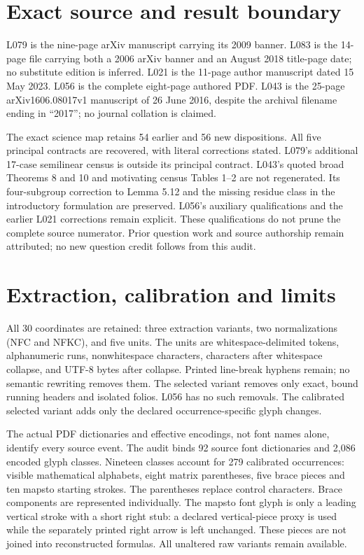 \documentclass[11pt,a4paper]{article}
\begin{document}
\section*{Exact source and result boundary}
L079 is the nine-page arXiv manuscript carrying its 2009 banner. L083 is the 14-page file carrying both a 2006 arXiv banner and an August 2018 title-page date; no substitute edition is inferred. L021 is the 11-page author manuscript dated 15 May 2023. L056 is the complete eight-page authored PDF. L043 is the 25-page arXiv1606.08017v1 manuscript of 26 June 2016, despite the archival filename ending in ``2017''; no journal collation is claimed.

The exact science map retains 54 earlier and 56 new dispositions. All five principal contracts are recovered, with literal corrections stated. L079's additional 17-case semilinear census is outside its principal contract. L043's quoted broad Theorems 8 and 10 and motivating census Tables 1--2 are not regenerated. Its four-subgroup correction to Lemma 5.12 and the missing residue class in the introductory formulation are preserved. L056's auxiliary qualifications and the earlier L021 corrections remain explicit. These qualifications do not prune the complete source numerator. Prior question work and source authorship remain attributed; no new question credit follows from this audit.
\newpage
\section*{Extraction, calibration and limits}
All 30 coordinates are retained: three extraction variants, two normalizations (NFC and NFKC), and five units. The units are whitespace-delimited tokens, alphanumeric runs, nonwhitespace characters, characters after whitespace collapse, and UTF-8 bytes after collapse. Printed line-break hyphens remain; no semantic rewriting removes them. The selected variant removes only exact, bound running headers and isolated folios. L056 has no such removals. The calibrated selected variant adds only the declared occurrence-specific glyph changes.

The actual PDF dictionaries and effective encodings, not font names alone, identify every source event. The audit binds 92 source font dictionaries and 2,086 encoded glyph classes. Nineteen classes account for 279 calibrated occurrences: visible mathematical alphabets, eight matrix parentheses, five brace pieces and ten mapsto starting strokes. The parentheses replace control characters. Brace components are represented individually. The mapsto font glyph is only a leading vertical stroke with a short right stub: a declared vertical-piece proxy is used while the separately printed right arrow is left unchanged. These pieces are not joined into reconstructed formulas. All unaltered raw variants remain available.
\end{document}
